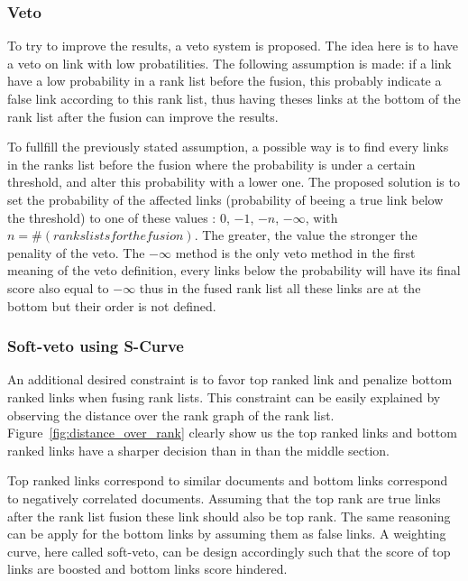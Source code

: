 \subsubsection{Veto}

To try to improve the results, a veto system is proposed.
The idea here is to have a veto on link with low probatilities.
The following assumption is made: if a link have a low probability in a rank list before the fusion, this probably indicate a false link according to this rank list, thus having theses links at the bottom of the rank list after the fusion can improve the results.

To fullfill the previously stated assumption, a possible way is to find every links in the ranks list before the fusion where the probability is under a certain threshold, and alter this probability with a lower one.
The proposed solution is to set the probability of the affected links (probability of beeing a true link below the threshold) to one of these values : $0$, $-1$, $-n$, $-\infty$, with $n = \#(ranks lists for the fusion)$.
The greater, the value the stronger the penality of the veto.
The $-\infty$ method is the only veto method in the first meaning of the veto definition, every links below the probability will have its final score also equal to $-\infty$ thus in the fused rank list all these links are at the bottom but their order is not defined.

\subsubsection{Soft-veto using S-Curve}

An additional desired constraint is to favor top ranked link and penalize bottom ranked links when fusing rank lists.
This constraint can be easily explained by observing the distance over the rank graph of the rank list.
Figure~\ref{fig:distance_over_rank} clearly show us the top ranked links and bottom ranked links have a sharper decision than in than the middle section.

Top ranked links correspond to similar documents and bottom links correspond to negatively correlated documents.
Assuming that the top rank are true links after the rank list fusion these link should also be top rank.
The same reasoning can be apply for the bottom links by assuming them as false links.
A weighting curve, here called soft-veto, can be design accordingly such that the score of top links are boosted and  bottom links score hindered.

